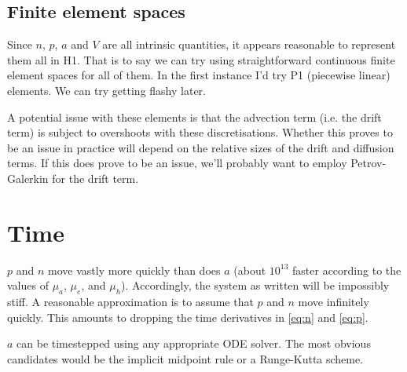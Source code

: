 \documentclass[a4paper,11pt]{article}
\begin{document}
\subsection{Finite element spaces}

Since $n$, $p$, $a$ and $V$ are all intrinsic quantities, it appears
reasonable to represent them all in H1. That is to say we can try using
straightforward continuous finite element spaces for all of them. In the
first instance I'd try P1 (piecewise linear) elements. We can try getting
flashy later.

A potential issue with these elements is that the advection term (i.e. the
drift term) is subject to overshoots with these discretisations. Whether
this proves to be an issue in practice will depend on the relative sizes of
the drift and diffusion terms. If this does prove to be an issue, we'll
probably want to employ Petrov-Galerkin for the drift term.

\section{Time}

$p$ and $n$ move vastly more quickly than does $a$ (about $10^{13}$ faster
according to the values of $\mu_a$, $\mu_e$, and $\mu_h$). Accordingly, the
system as written will be impossibly stiff. A reasonable approximation is to
assume that $p$ and $n$ move infinitely quickly. This amounts to dropping
the time derivatives in \eqref{eq:n} and \eqref{eq:p}.

$a$ can be timestepped using any appropriate ODE solver. The most obvious
candidates would be the implicit midpoint rule or a Runge-Kutta scheme.

\printbibliography
\end{document}
